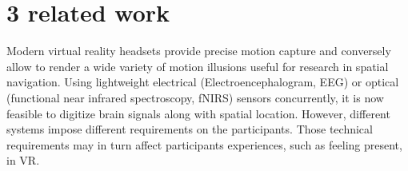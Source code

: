 \section{3 related work}
Modern virtual reality headsets provide precise motion capture and conversely allow to render a wide variety of motion illusions useful for research in spatial navigation. Using lightweight electrical (Electroencephalogram, EEG) or optical (functional near infrared spectroscopy, fNIRS) sensors concurrently, it is now feasible to digitize brain signals along with spatial location. However, different systems impose different requirements on the participants. Those technical requirements may in turn affect participants experiences, such as feeling present, in VR. \cite{} %

